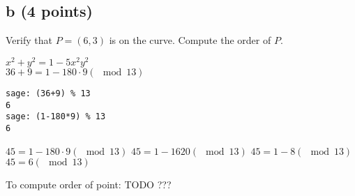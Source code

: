 \documentclass{article}
\begin{document}
\subsection{b (4 points)}
Verify that $P = (6, 3)$ is on the curve. Compute the
order of $P$.

$x^2+y^2 = 1 - 5x^2y^2$ \\
$36+9 = 1 - 180 \cdot 9 (\mod 13)$
\begin{verbatim}
sage: (36+9) % 13
6
sage: (1-180*9) % 13
6
\end{verbatim}
$45 = 1 - 180 \cdot 9 (\mod 13)$
$45 = 1 - 1620 (\mod 13)$
$45 = 1 - 8 (\mod 13)$
$45 = 6 (\mod 13)$

To compute order of point:
TODO ???
\end{document}
